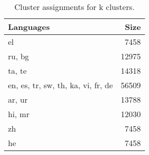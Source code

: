 \begin{table}
\caption{Cluster assignments for {k} clusters.}
\label{tab:chung_clusters_k8}
\begin{tabular}{lr}
\toprule
Languages & Size \\
\midrule
el & 7458 \\
ru, bg & 12975 \\
ta, te & 14318 \\
en, es, tr, sw, th, ka, vi, fr, de & 56509 \\
ar, ur & 13788 \\
hi, mr & 12030 \\
zh & 7458 \\
he & 7458 \\
\bottomrule
\end{tabular}
\end{table}
